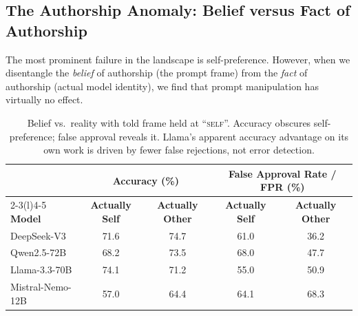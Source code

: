 \subsection{The Authorship Anomaly: Belief versus Fact of Authorship}
\label{sec:results-belief}

The most prominent failure in the landscape is self-preference. However, when we disentangle the \emph{belief} of authorship (the prompt frame) from the \emph{fact} of authorship (actual model identity), we find that prompt manipulation has virtually no effect.

\begin{table}[t]
\centering
\footnotesize
\renewcommand{\arraystretch}{0.92}
\caption{Belief vs.\ reality with told frame held at ``\textsc{self}''. Accuracy obscures self-preference; false approval reveals it. Llama's apparent accuracy advantage on its own work is driven by fewer false rejections, not error detection.}
\label{tab:belief-reality}
\begin{tabular}{lcccc}
\toprule
& \multicolumn{2}{c}{\bf Accuracy (\%)} & \multicolumn{2}{c}{\bf False Approval Rate / FPR (\%)} \\
\cmidrule(r){2-3}\cmidrule(l){4-5}
\bf Model & \bf Actually Self & \bf Actually Other & \bf Actually Self & \bf Actually Other \\
\midrule
DeepSeek-V3 & 71.6 & 74.7 & 61.0 & 36.2 \\
Qwen2.5-72B & 68.2 & 73.5 & 68.0 & 47.7 \\
Llama-3.3-70B & 74.1 & 71.2 & 55.0 & 50.9 \\
Mistral-Nemo-12B & 57.0 & 64.4 & 64.1 & 68.3 \\
\bottomrule
\end{tabular}
\end{table}

